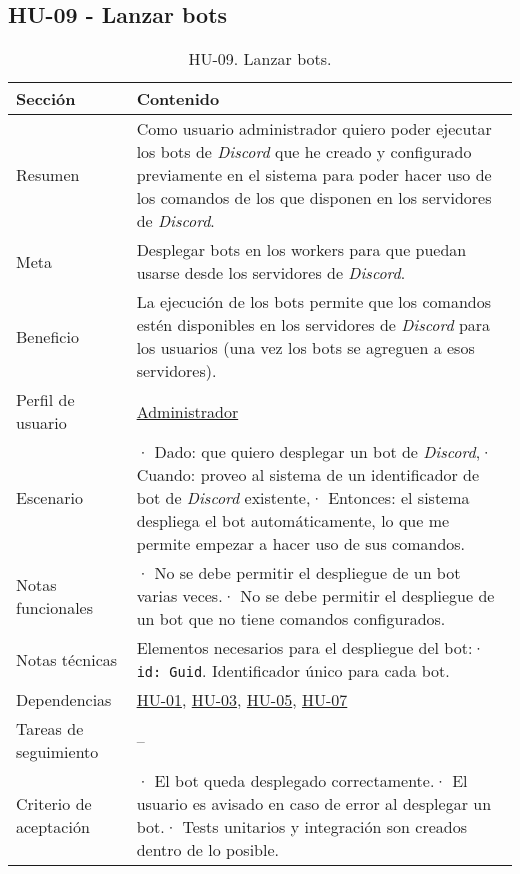 \subsection{HU-09 - Lanzar bots}
\label{sec:hu09}

\begin{table}[H]
    \centering
    \def\arraystretch{1.25}
    \begin{adjustbox}{max width=\textwidth}
    \begin{tabularx}{\textwidth}{|l|L|}
    \hline
        \textbf{Sección} & \textbf{Contenido} \\ \hline
    \hline
        Resumen & Como usuario administrador quiero poder ejecutar los bots de \textit{Discord} que he creado y configurado previamente en el sistema para poder hacer uso de los comandos de los que disponen en los servidores de \textit{Discord}. \\ \hline
        Meta & Desplegar bots en los workers para que puedan usarse desde los servidores de \textit{Discord}. \\ \hline
        Beneficio & La ejecución de los bots permite que los comandos estén disponibles en los servidores de \textit{Discord} para los usuarios (una vez los bots se agreguen a esos servidores). \\ \hline
        Perfil de usuario & \hyperref[sec:personaAdmin]{Administrador} \\ \hline
        Escenario & · Dado: que quiero desplegar un bot de \textit{Discord},\linebreak · Cuando: proveo al sistema de un identificador de bot de \textit{Discord} existente,\linebreak · Entonces: el sistema despliega el bot automáticamente, lo que me permite empezar a hacer uso de sus comandos. \\ \hline
        Notas funcionales & · No se debe permitir el despliegue de un bot varias veces.\linebreak · No se debe permitir el despliegue de un bot que no tiene comandos configurados. \\ \hline
        Notas técnicas & Elementos necesarios para el despliegue del bot:\linebreak · \verb|id: Guid|. Identificador único para cada bot. \\ \hline
        Dependencias & \hyperref[sec:hu01]{HU-01}, \hyperref[sec:hu03]{HU-03}, \hyperref[sec:hu05]{HU-05}, \hyperref[sec:hu07]{HU-07} \\ \hline
        Tareas de seguimiento & – \\ \hline
        Criterio de aceptación & · El bot queda desplegado correctamente.\linebreak · El usuario es avisado en caso de error al desplegar un bot.\linebreak · Tests unitarios y integración son creados dentro de lo posible. \\ \hline
    \end{tabularx}
    \end{adjustbox}
    \caption{HU-09. Lanzar bots.}
\end{table}

